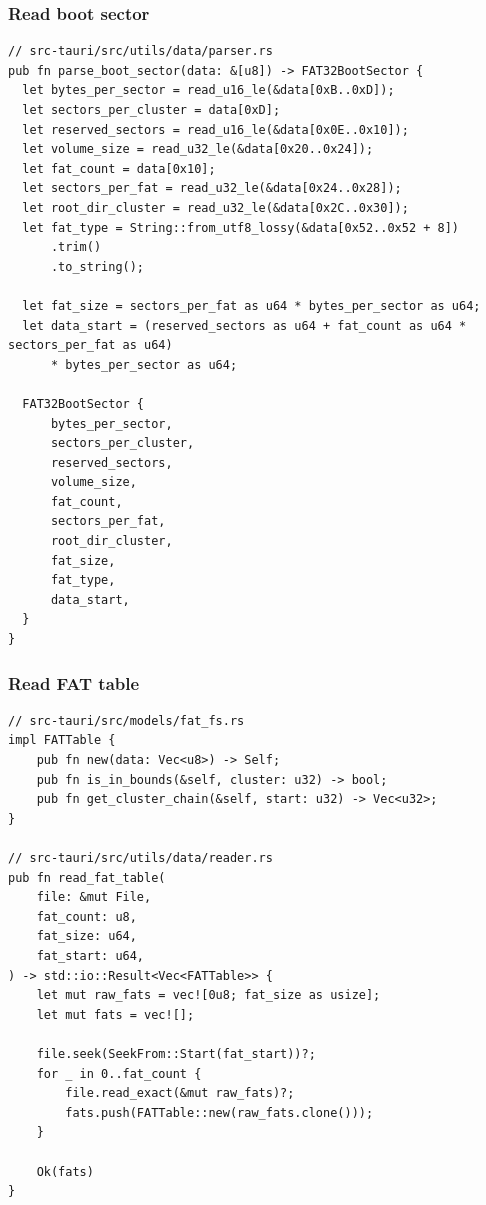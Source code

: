 \documentclass[a4paper,12pt]{report}
\begin{document}
\subsubsection*{Read boot sector}
\begin{verbatim}
// src-tauri/src/utils/data/parser.rs
pub fn parse_boot_sector(data: &[u8]) -> FAT32BootSector {
  let bytes_per_sector = read_u16_le(&data[0xB..0xD]);
  let sectors_per_cluster = data[0xD];
  let reserved_sectors = read_u16_le(&data[0x0E..0x10]);
  let volume_size = read_u32_le(&data[0x20..0x24]);
  let fat_count = data[0x10];
  let sectors_per_fat = read_u32_le(&data[0x24..0x28]);
  let root_dir_cluster = read_u32_le(&data[0x2C..0x30]);
  let fat_type = String::from_utf8_lossy(&data[0x52..0x52 + 8])
      .trim()
      .to_string();

  let fat_size = sectors_per_fat as u64 * bytes_per_sector as u64;
  let data_start = (reserved_sectors as u64 + fat_count as u64 * sectors_per_fat as u64)
      * bytes_per_sector as u64;

  FAT32BootSector {
      bytes_per_sector,
      sectors_per_cluster,
      reserved_sectors,
      volume_size,
      fat_count,
      sectors_per_fat,
      root_dir_cluster,
      fat_size,
      fat_type,
      data_start,
  }
}
\end{verbatim}
\subsubsection*{Read FAT table}
\begin{verbatim}
// src-tauri/src/models/fat_fs.rs
impl FATTable {
    pub fn new(data: Vec<u8>) -> Self;
    pub fn is_in_bounds(&self, cluster: u32) -> bool;
    pub fn get_cluster_chain(&self, start: u32) -> Vec<u32>;
}

// src-tauri/src/utils/data/reader.rs
pub fn read_fat_table(
    file: &mut File,
    fat_count: u8,
    fat_size: u64,
    fat_start: u64,
) -> std::io::Result<Vec<FATTable>> {
    let mut raw_fats = vec![0u8; fat_size as usize];
    let mut fats = vec![];

    file.seek(SeekFrom::Start(fat_start))?;
    for _ in 0..fat_count {
        file.read_exact(&mut raw_fats)?;
        fats.push(FATTable::new(raw_fats.clone()));
    }

    Ok(fats)
}
\end{verbatim}
\end{document}
